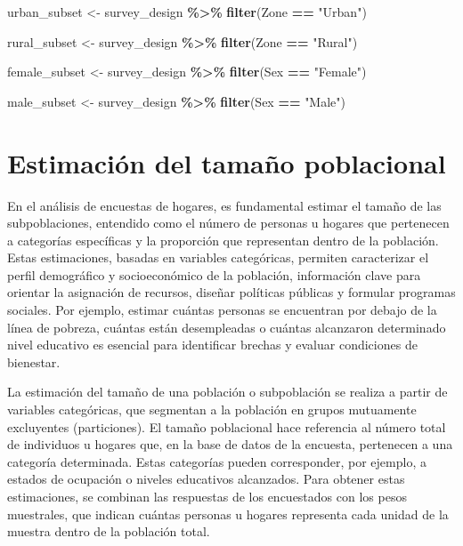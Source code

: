 \documentclass[
  spanish,
  12pt,
]{book}
\newenvironment{Shaded}{\begin{snugshade}}{\end{snugshade}}
\newcommand{\FunctionTok}[1]{\textcolor[rgb]{0.13,0.29,0.53}{\textbf{#1}}}
\newcommand{\NormalTok}[1]{#1}
\newcommand{\OtherTok}[1]{\textcolor[rgb]{0.56,0.35,0.01}{#1}}
\newcommand{\SpecialCharTok}[1]{\textcolor[rgb]{0.81,0.36,0.00}{\textbf{#1}}}
\newcommand{\StringTok}[1]{\textcolor[rgb]{0.31,0.60,0.02}{#1}}
\begin{document}
\begin{Shaded}
\begin{Highlighting}[]
\NormalTok{urban\_subset }\OtherTok{\textless{}{-}}\NormalTok{ survey\_design }\SpecialCharTok{\%\textgreater{}\%}
  \FunctionTok{filter}\NormalTok{(Zone }\SpecialCharTok{==} \StringTok{"Urban"}\NormalTok{)}

\NormalTok{rural\_subset }\OtherTok{\textless{}{-}}\NormalTok{ survey\_design }\SpecialCharTok{\%\textgreater{}\%}
  \FunctionTok{filter}\NormalTok{(Zone }\SpecialCharTok{==} \StringTok{"Rural"}\NormalTok{)}

\NormalTok{female\_subset }\OtherTok{\textless{}{-}}\NormalTok{ survey\_design }\SpecialCharTok{\%\textgreater{}\%}
  \FunctionTok{filter}\NormalTok{(Sex }\SpecialCharTok{==} \StringTok{"Female"}\NormalTok{)}

\NormalTok{male\_subset }\OtherTok{\textless{}{-}}\NormalTok{ survey\_design }\SpecialCharTok{\%\textgreater{}\%}
  \FunctionTok{filter}\NormalTok{(Sex }\SpecialCharTok{==} \StringTok{"Male"}\NormalTok{)}
\end{Highlighting}
\end{Shaded}

\section{Estimación del tamaño poblacional}\label{estimacion-del-tamano-poblacional}

En el análisis de encuestas de hogares, es fundamental estimar el tamaño de las subpoblaciones, entendido como el número de personas u hogares que pertenecen a categorías específicas y la proporción que representan dentro de la población. Estas estimaciones, basadas en variables categóricas, permiten caracterizar el perfil demográfico y socioeconómico de la población, información clave para orientar la asignación de recursos, diseñar políticas públicas y formular programas sociales. Por ejemplo, estimar cuántas personas se encuentran por debajo de la línea de pobreza, cuántas están desempleadas o cuántas alcanzaron determinado nivel educativo es esencial para identificar brechas y evaluar condiciones de bienestar.

La estimación del tamaño de una población o subpoblación se realiza a partir de variables categóricas, que segmentan a la población en grupos mutuamente excluyentes (particiones). El tamaño poblacional hace referencia al número total de individuos u hogares que, en la base de datos de la encuesta, pertenecen a una categoría determinada. Estas categorías pueden corresponder, por ejemplo, a estados de ocupación o niveles educativos alcanzados. Para obtener estas estimaciones, se combinan las respuestas de los encuestados con los pesos muestrales, que indican cuántas personas u hogares representa cada unidad de la muestra dentro de la población total.
\end{document}
